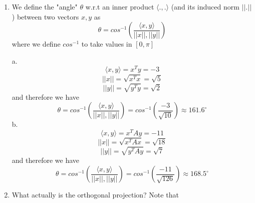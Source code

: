 \documentclass{article}
\newcommand{\chapternumber}{3}
\newenvironment{QandA}{\begin{enumerate}[label=\chapternumber.\arabic*]\bfseries\boldmath}
	{\end{enumerate}}
\newenvironment{answered}{\par\bigskip\normalfont\unboldmath}{}
\begin{document}
\begin{QandA}
		\item
		\begin{answered}
			We define the "angle" $\theta$ w.r.t an inner product $\langle .,. \rangle$ (and its induced norm $||.||$) between two vectors $x,y$ as
			\[\theta = cos^{-1}\left(\frac{\langle x,y \rangle}{||x||,||y||}\right)\]
			where we define $cos^{-1}$ to take values in $[0,\pi]$
			
			a. 
			\[\langle x,y \rangle = x^Ty = -3\]
			\[||x|| = \sqrt{x^Tx} = \sqrt{5}\]
			\[||y|| = \sqrt{y^Ty} = \sqrt{2}\]
			and therefore we have
			\[\theta = cos^{-1}\left(\frac{\langle x,y \rangle}{||x||,||y||}\right) = cos^{-1}\left(\frac{-3}{\sqrt{10}}\right)\approx 161.6^\circ\]
			b.
			\[\langle x,y \rangle = x^TAy = -11\]
			\[||x|| = \sqrt{x^TAx} = \sqrt{18}\]
			\[||y|| = \sqrt{y^TAy} = \sqrt{7}\]
			and therefore we have
			\[\theta = cos^{-1}\left(\frac{\langle x,y \rangle}{||x||,||y||}\right) = cos^{-1}\left(\frac{-11}{\sqrt{126}}\right)\approx 168.5^\circ\]
		\end{answered}
		
		\item
		\begin{answered}
			What actually is the orthogonal projection? Note that 
		\end{answered}
	\end{QandA}
\end{document}
